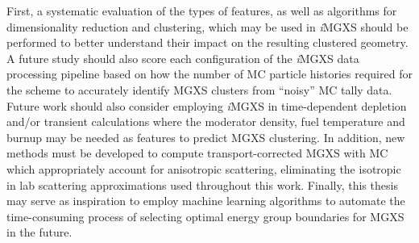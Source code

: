 \documentclass[12pt,twoside]{mitthesis-exec}
\begin{document}
First, a systematic evaluation of the types of features, as well as algorithms for dimensionality reduction and clustering, which may be used in \textit{i}MGXS should be performed to better understand their impact on the resulting clustered geometry. A future study should also score each configuration of the \textit{i}MGXS data processing pipeline based on how the number of MC particle histories required for the scheme to accurately identify MGXS clusters from ``noisy'' MC tally data. Future work should also consider employing \textit{i}MGXS in time-dependent depletion and/or transient calculations where the moderator density, fuel temperature and burnup may be needed as features to predict MGXS clustering. In addition, new methods must be developed to compute transport-corrected MGXS with MC which appropriately account for anisotropic scattering, eliminating the isotropic in lab scattering approximations used throughout this work. Finally, this thesis may serve as inspiration to employ machine learning algorithms to automate the time-consuming process of selecting optimal energy group boundaries for MGXS in the future.






\begin{singlespace}


\end{singlespace}
\end{document}
